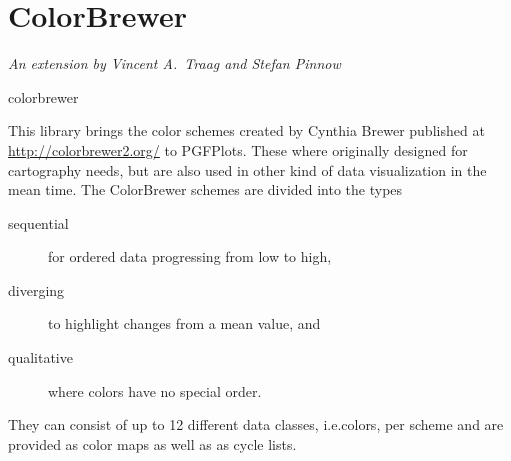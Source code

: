 {{%
}}

\section[libs.colorbrewer]{ColorBrewer}
\def\pgfplotsmanualcurlibrary{colormaps}

{\emph{An extension by Vincent A.\ Traag and Stefan Pinnow}}

\begin{pgfplotslibrary}{colorbrewer}

This library brings the color schemes created by Cynthia Brewer published at
\url{http://colorbrewer2.org/} to PGFPlots. These where originally designed for
cartography needs, but are also used in other kind of data visualization in the
mean time. The ColorBrewer schemes are divided into the types
%
\begin{description}
    \item[sequential] for ordered data progressing from low to high,
    \item[diverging] to highlight changes from a mean value, and
    \item[qualitative] where colors have no special order.
\end{description}
%
They can consist of up to 12 different data classes, i.e.\@ colors, per scheme
and are provided as color maps as well as as cycle lists.

{%
\centering

}
\end{pgfplotslibrary}
